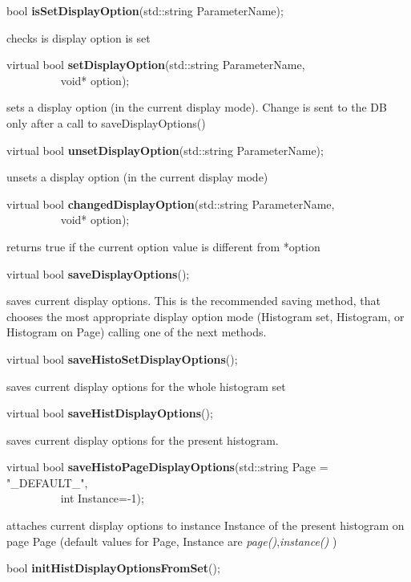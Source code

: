 \item    bool {\bf isSetDisplayOption}(std::string ParameterName);


 checks is display option is set


\item    virtual bool {\bf setDisplayOption}(std::string ParameterName,\\\mbox{}~~~~~~~~~
			void* option);

 sets a display option (in the current display mode). Change is sent to the DB only 
 after a call to saveDisplayOptions()


\item    virtual bool {\bf unsetDisplayOption}(std::string ParameterName);


 unsets a display option (in the current display mode)


\item    virtual bool {\bf changedDisplayOption}(std::string ParameterName,\\\mbox{}~~~~~~~~~ 
				    void* option);

 returns true if the current option value is different from *option


\item    virtual bool {\bf saveDisplayOptions}();


 saves current display options.  This is the recommended saving method, that
 chooses the most appropriate display option mode 
 (Histogram set, Histogram, or Histogram on Page) calling one of the next methods.


\item    virtual bool {\bf saveHistoSetDisplayOptions}();


 saves current display options for the whole histogram set


\item    virtual bool {\bf saveHistDisplayOptions}();


 saves current display options for the present histogram.


\item    virtual bool {\bf saveHistoPageDisplayOptions}(std::string Page = "\_DEFAULT\_",\\\mbox{}~~~~~~~~~
					   int Instance=-1);

 attaches current display options to instance Instance of the present histogram on page 
 Page (default values for Page, Instance are {\it page()},{\it instance()}  )


\item    bool {\bf initHistDisplayOptionsFromSet}(); 


